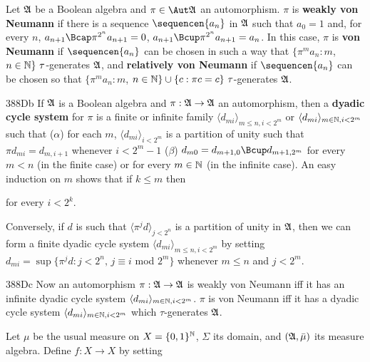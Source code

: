 Let $\frak A$ be a Boolean algebra and $\pi\in\Aut\frak A$ an
automorphism.   $\pi$ is {\bf weakly von Neumann} if there is a
sequence $\sequencen{a_n}$ in $\frak A$ such that $a_0=1$ and,
for every $n$, $a_{n+1}\Bcap\pi^{2^n}a_{n+1}=0$,
$a_{n+1}\Bcup\pi^{2^n}a_{n+1}=a_n$.
In this case, $\pi$ is {\bf von Neumann} if $\sequencen{a_n}$ can be
chosen in such a way that
$\{\pi^ma_n:m$, $n\in\Bbb N\}\,\,\tau$-generates $\frak A$, and
{\bf relatively von Neumann} if $\sequencen{a_n}$ can be chosen so that
$\{\pi^ma_n:m$, $n\in\Bbb N\}\cup\{c:\pi c=c\}\,\,\tau$-generates
$\frak A$.
     
\spheader 388Db   If $\frak A$ is a Boolean algebra
and $\pi:\frak A\to\frak A$ an automorphism, then a {\bf dyadic cycle
system} for $\pi$ is a finite or infinite family
$\langle d_{mi}\rangle_{m\le n,i<2^m}$ or
$\langle d_{mi}\rangle_{m\in\Bbb N,i<2^m}$
such that ($\alpha$) for each
$m$, $\langle d_{mi}\rangle_{i<2^m}$ is a partition of unity such that
$\pi d_{mi}=d_{m,i+1}$ whenever $i<2^m-1$
($\beta$) $d_{m0}=d_{m+1,0}\Bcup d_{m+1,2^m}$
for every $m<n$ (in the finite case) or
for every $m\in\Bbb N$ (in the infinite case).
An easy induction on $m$ shows that if $k\le m$ then
     
     
\noindent for every $i<2^k$.
     
Conversely, if $d$ is such that $\langle\pi^jd\rangle_{j<2^n}$ is a
partition of unity in $\frak A$, then we can form a finite dyadic cycle
system $\langle d_{mi}\rangle_{m\le n,i<2^m}$ by setting
$d_{mi}=\sup\{\pi^jd:j<2^n,\,j\equiv i$ mod $2^m\}$ whenever $m\le n$
and $j<2^m$.
     
\spheader 388Dc Now an
automorphism $\pi:\frak A\to\frak A$ is weakly von Neumann iff
it has an infinite dyadic cycle system
$\langle d_{mi}\rangle_{m\in\Bbb N,i<2^m}$.      $\pi$ is
von Neumann iff
it has a dyadic cycle system $\langle d_{mi}\rangle_{m\in\Bbb N,i<2^m}$
which $\tau$-generates $\frak A$.
     
   Let $\mu$ be the usual
measure on $X=\{0,1\}^{\Bbb N}$, $\Sigma$ its domain,  and
$(\frak A,\bar\mu)$ its measure algebra.   Define $f:X\to X$ by setting
     
